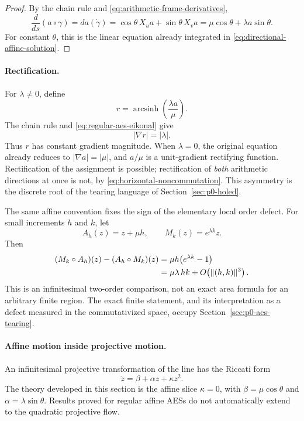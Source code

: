 \begin{proof}
By the chain rule and \eqref{eq:arithmetic-frame-derivatives},
\[
 \frac{d}{ds}(a\circ\gamma)
 =da(\dot\gamma)
 =\cos\theta\,X_u a+\sin\theta\,X_v a
 =\mu\cos\theta+\lambda a\sin\theta.
\]
For constant $\theta$, this is the linear equation already integrated in
\eqref{eq:directional-affine-solution}.
\end{proof}

\paragraph{Rectification.}
For $\lambda\ne0$, define
\begin{equation}\label{eq:rectifying-assignment}
 r=\operatorname{arcsinh}\!\left(\frac{\lambda a}{\mu}\right).
\end{equation}
The chain rule and \eqref{eq:regular-aes-eikonal} give
\begin{equation}\label{eq:rectified-eikonal}
 |\nabla r|=|\lambda|.
\end{equation}
Thus $r$ has constant gradient magnitude.  When $\lambda=0$, the original
equation already reduces to $|\nabla a|=|\mu|$, and $a/\mu$ is a
unit-gradient rectifying function.  Rectification of the assignment is
possible; rectification of \emph{both} arithmetic directions at once is not, by
\eqref{eq:horizontal-noncommutation}.  This asymmetry is the discrete root of
the tearing language of Section~\ref{sec:p0-holed}.

The same affine convention fixes the sign of the elementary local order defect.
For small increments $h$ and $k$, let
\[
 A_h(z)=z+\mu h,
 \qquad
 M_k(z)=e^{\lambda k}z.
\]
Then
\begin{align}
 (M_k\circ A_h)(z)-(A_h\circ M_k)(z)
 &=\mu h\bigl(e^{\lambda k}-1\bigr)\notag\\
 &=\mu\lambda\,hk+O\!\left(\lVert(h,k)\rVert^3\right).
 \label{eq:infinitesimal-order-defect}
\end{align}
This is an infinitesimal two-order comparison, not an exact area formula for an
arbitrary finite region.  The exact finite statement, and its interpretation as
a defect measured in the commutativized space, occupy
Section~\ref{sec:p0-acs-tearing}.

\paragraph{Affine motion inside projective motion.}
An infinitesimal projective transformation of the line has the Riccati form
\[
 \dot z=\beta+\alpha z+\kappa z^2.
\]
The theory developed in this section is the affine slice $\kappa=0$, with
$\beta=\mu\cos\theta$ and $\alpha=\lambda\sin\theta$.  Results proved for
regular affine AESs do not automatically extend to the quadratic projective
flow.

